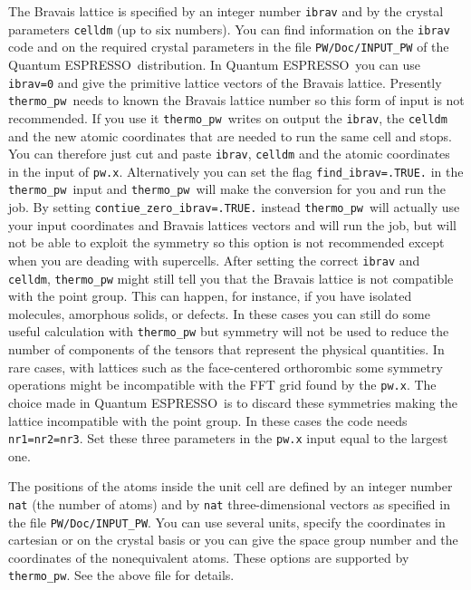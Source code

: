 \documentclass[12pt,a4paper]{article}
\def\qe{{\sc Quantum ESPRESSO}}
\def\thermo{\texttt{thermo\_pw}}
\begin{document}
The Bravais lattice is specified by an integer number \texttt{ibrav} and by the
crystal parameters \texttt{celldm} (up to six numbers). You can find 
information on the \texttt{ibrav} code and on the required crystal parameters
in the file \texttt{PW/Doc/INPUT\_PW} of the \qe\ distribution. 
In \qe\ you can use \texttt{ibrav=0} and give the primitive
lattice vectors of the Bravais lattice. Presently \thermo\ needs to
known the Bravais lattice number so this form of input is not recommended. 
If you use it \thermo\ writes on output the \texttt{ibrav}, the 
\texttt{celldm} and the new atomic coordinates that are needed to run 
the same cell and stops.
You can therefore just cut and paste \texttt{ibrav}, \texttt{celldm} 
and the atomic coordinates in the input of \texttt{pw.x}. Alternatively
you can set the flag \texttt{find\_ibrav=.TRUE.} in the \thermo\ input
and \thermo\ will make the conversion for you and run the job. By setting 
\texttt{contiue\_zero\_ibrav=.TRUE.} instead \thermo\ will actually use your
input coordinates and Bravais lattices vectors and will run the job, but will 
not be able to exploit the symmetry so this option is not recommended 
except when you are deading with supercells. After setting the correct
\texttt{ibrav} and \texttt{celldm}, \texttt{thermo\_pw} might still tell you
that the Bravais lattice is not compatible with the point group. This
can happen, for instance, if you have isolated molecules, amorphous solids,
or defects. In these cases you can still do some useful calculation
with \texttt{thermo\_pw} but symmetry will not be used to reduce the
number of components of the tensors that represent the physical quantities.
In rare cases, with lattices such as the face-centered orthorombic some
symmetry operations might be incompatible with the FFT grid found by the
\texttt{pw.x}. The choice made in \qe\ is to discard these symmetries making
the lattice incompatible with the point group. In these cases the code needs 
\texttt{nr1=nr2=nr3}. Set these three parameters in the \texttt{pw.x} input 
equal to the largest one. 

The positions of the atoms inside the unit cell are defined by an integer
number \texttt{nat} (the number of atoms) and by \texttt{nat} 
three-dimensional vectors as specified in the file \texttt{PW/Doc/INPUT\_PW}.
You can use several units, specify the coordinates in cartesian or on the
crystal basis or you can give the space group number and the
coordinates of the nonequivalent atoms. 
These options are supported by \thermo. See the above file for details. \\
\end{document}
